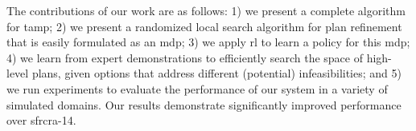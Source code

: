 The contributions of our work are as follows: 1) we present a complete
algorithm for {\sc tamp}; 2) we present a randomized local search
algorithm for plan refinement that is easily formulated as an {\sc
  mdp}; 3) we apply {\sc rl} to learn a policy for this {\sc mdp}; 4)
we learn from expert demonstrations to efficiently search the space of
high-level plans, given options that address different (potential)
infeasibilities; and 5) we run experiments to evaluate the performance
of our system in a variety of simulated domains. Our results
demonstrate significantly improved performance over {\sc sfrcra-14}.
